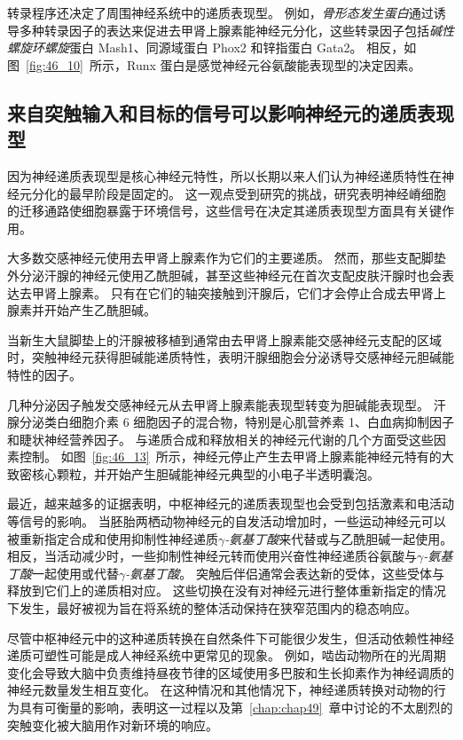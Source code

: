 转录程序还决定了周围神经系统中的递质表现型。
例如，\textit{骨形态发生蛋白}通过诱导多种转录因子的表达来促进去甲肾上腺素能神经元分化，这些转录因子包括\textit{碱性螺旋环螺旋}蛋白 Mash1、同源域蛋白 Phox2 和锌指蛋白 Gata2。
相反，如图~\ref{fig:46_10}~所示，Runx 蛋白是感觉神经元谷氨酸能表现型的决定因素。



\subsection{来自突触输入和目标的信号可以影响神经元的递质表现型}

因为神经递质表现型是核心神经元特性，所以长期以来人们认为神经递质特性在神经元分化的最早阶段是固定的。
这一观点受到研究的挑战，研究表明神经嵴细胞的迁移通路使细胞暴露于环境信号，这些信号在决定其递质表现型方面具有关键作用。


大多数交感神经元使用去甲肾上腺素作为它们的主要递质。
然而，那些支配脚垫外分泌汗腺的神经元使用乙酰胆碱，甚至这些神经元在首次支配皮肤汗腺时也会表达去甲肾上腺素。
只有在它们的轴突接触到汗腺后，它们才会停止合成去甲肾上腺素并开始产生乙酰胆碱。


当新生大鼠脚垫上的汗腺被移植到通常由去甲肾上腺素能交感神经元支配的区域时，突触神经元获得胆碱能递质特性，表明汗腺细胞会分泌诱导交感神经元胆碱能特性的因子。


几种分泌因子触发交感神经元从去甲肾上腺素能表现型转变为胆碱能表现型。
汗腺分泌类白细胞介素 6 细胞因子的混合物，特别是心肌营养素 1、白血病抑制因子和睫状神经营养因子。
与递质合成和释放相关的神经元代谢的几个方面受这些因素控制。
如图~\ref{fig:46_13}~所示，神经元停止产生去甲肾上腺素能神经元特有的大致密核心颗粒，并开始产生胆碱能神经元典型的小电子半透明囊泡。


最近，越来越多的证据表明，中枢神经元的递质表现型也会受到包括激素和电活动等信号的影响。
当胚胎两栖动物神经元的自发活动增加时，一些运动神经元可以被重新指定合成和使用抑制性神经递质\textit{$\gamma$-氨基丁酸}来代替或与乙酰胆碱一起使用。
相反，当活动减少时，一些抑制性神经元转而使用兴奋性神经递质谷氨酸与\textit{$\gamma$-氨基丁酸}一起使用或代替\textit{$\gamma$-氨基丁酸}。
突触后伴侣通常会表达新的受体，这些受体与释放到它们上的递质相对应。
这些切换在没有对神经元进行整体重新指定的情况下发生，最好被视为旨在将系统的整体活动保持在狭窄范围内的稳态响应。


尽管中枢神经元中的这种递质转换在自然条件下可能很少发生，但活动依赖性神经递质可塑性可能是成人神经系统中更常见的现象。
例如，啮齿动物所在的光周期变化会导致大脑中负责维持昼夜节律的区域使用多巴胺和生长抑素作为神经调质的神经元数量发生相互变化。
在这种情况和其他情况下，神经递质转换对动物的行为具有可衡量的影响，表明这一过程以及第~\ref{chap:chap49}~章中讨论的不太剧烈的突触变化被大脑用作对新环境的响应。



